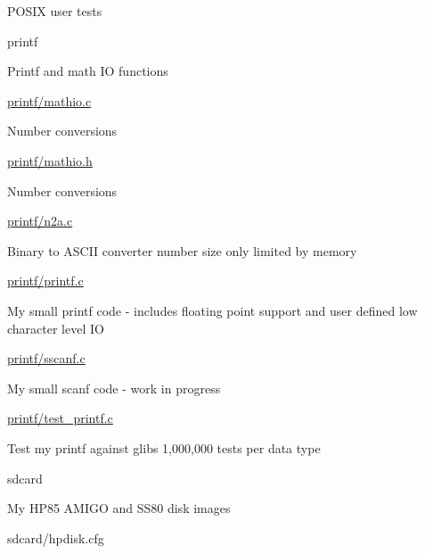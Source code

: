\begin{DoxyItemize}
\begin{DoxyItemize}
\begin{DoxyItemize}
\item P\+O\+S\+IX user tests
\end{DoxyItemize}
\end{DoxyItemize}
\item printf
\begin{DoxyItemize}
\item Printf and math IO functions
\item \hyperlink{mathio_8c}{printf/mathio.\+c}
\begin{DoxyItemize}
\item Number conversions
\end{DoxyItemize}
\item \hyperlink{mathio_8h}{printf/mathio.\+h}
\begin{DoxyItemize}
\item Number conversions
\end{DoxyItemize}
\item \hyperlink{n2a_8c}{printf/n2a.\+c}
\begin{DoxyItemize}
\item Binary to A\+S\+C\+II converter number size only limited by memory
\end{DoxyItemize}
\item \hyperlink{printf_8c}{printf/printf.\+c}
\begin{DoxyItemize}
\item My small printf code -\/ includes floating point support and user defined low character level IO
\end{DoxyItemize}
\item \hyperlink{sscanf_8c}{printf/sscanf.\+c}
\begin{DoxyItemize}
\item My small scanf code -\/ work in progress
\end{DoxyItemize}
\item \hyperlink{test__printf_8c}{printf/test\+\_\+printf.\+c}
\begin{DoxyItemize}
\item Test my printf against glibs 1,000,000 tests per data type
\end{DoxyItemize}
\end{DoxyItemize}
\item sdcard
\begin{DoxyItemize}
\item My H\+P85 A\+M\+I\+GO and S\+S80 disk images
\begin{DoxyItemize}
\item sdcard/hpdisk.\+cfg
\begin{DoxyItemize}

\end{DoxyItemize}
\end{DoxyItemize}
\end{DoxyItemize}
\end{DoxyItemize}

